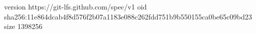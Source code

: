version https://git-lfs.github.com/spec/v1
oid sha256:11e864dcab4f8d576f2b07a1183e088c262fdd751b9b550155ca0be65c09bd23
size 1398256
